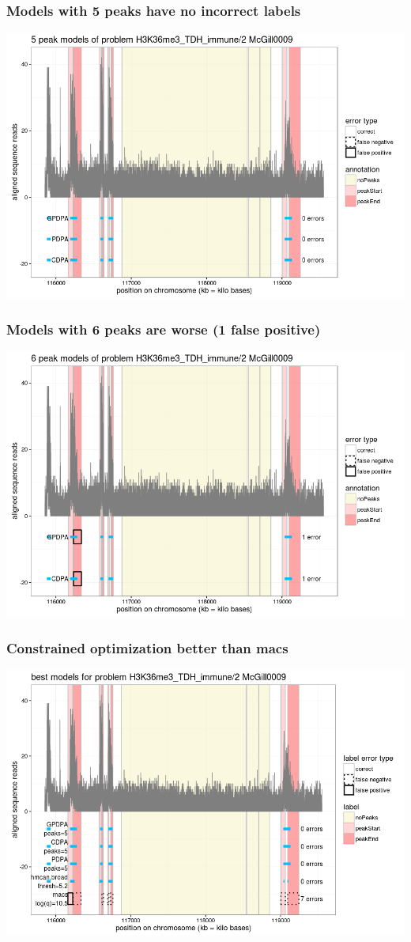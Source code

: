 \documentclass{beamer}
\begin{document}
\begin{frame}
  \frametitle{Models with 5 peaks have no incorrect labels}
  \includegraphics[width=\textwidth]{figure-min-train-error-problem5-5peaks}
\end{frame}


\begin{frame}
  \frametitle{Models with 6 peaks are worse (1 false positive)}
  \includegraphics[width=\textwidth]{figure-min-train-error-problem5-6peaks}
\end{frame}

\begin{frame}
  \frametitle{Constrained optimization better than macs}
  \includegraphics[width=\textwidth]{figure-min-train-error-problem5-best}
\end{frame}
\end{document}
